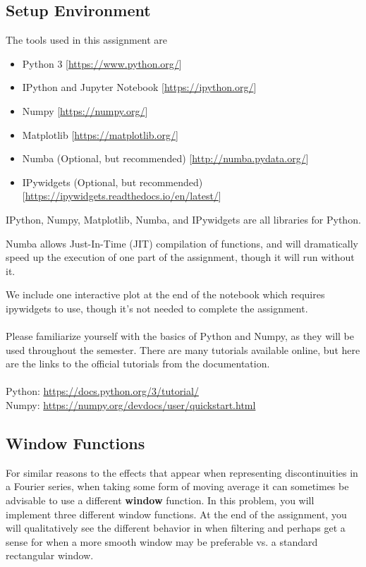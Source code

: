 \documentclass[12pt]{article}
\newcommand{\0}{\mathbf{0}}
\begin{document}
\subsection{Setup Environment}
The tools used in this assignment are
\begin{itemize} \setlength\itemsep{0.5mm}
\item Python 3 [\href{https://www.python.org/}{https://www.python.org/}]
\item IPython and Jupyter Notebook [\href{https://ipython.org/}{https://ipython.org/}]
\item Numpy [\href{https://numpy.org/}{https://numpy.org/}]
\item Matplotlib [\href{https://matplotlib.org/}{https://matplotlib.org/}]

\item Numba (Optional, but recommended) [\href{http://numba.pydata.org/}{http://numba.pydata.org/}]
\item IPywidgets (Optional, but recommended) [\href{https://ipywidgets.readthedocs.io/en/latest/}{https://ipywidgets.readthedocs.io/en/latest/}]
\end{itemize}

IPython, Numpy, Matplotlib, Numba, and IPywidgets are all libraries for Python.

Numba allows Just-In-Time (JIT) compilation of functions, and will dramatically speed up the execution of one part of the assignment, though it will run without it.

We include one interactive plot at the end of the notebook which requires ipywidgets to use, though it's not needed to complete the assignment.
\\
\\

Please familiarize yourself with the basics of Python and Numpy, as they will be used throughout the semester.
There are many tutorials available online, but here are the links to the official tutorials from the documentation.\\ \\
Python: \href{https://docs.python.org/3/tutorial/}{https://docs.python.org/3/tutorial/}\\
Numpy: \href{https://numpy.org/devdocs/user/quickstart.html}{https://numpy.org/devdocs/user/quickstart.html}

\pagebreak
\subsection{Window Functions}
For similar reasons to the effects that appear when representing discontinuities in a Fourier series, when taking some form of moving average it can sometimes be advisable to use a different \textbf{window} function.
In this problem, you will implement three different window functions. At the end of the assignment, you will qualitatively see the different behavior in when filtering and perhaps get a sense for when a more smooth window may be preferable vs. a standard rectangular window.
 
\end{document}
